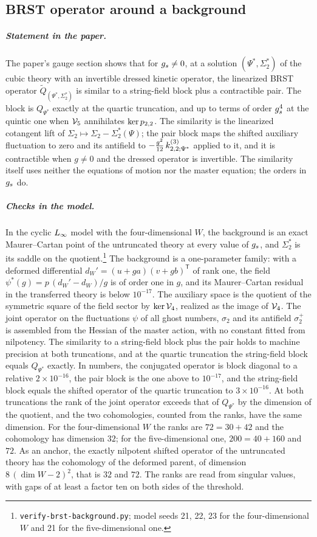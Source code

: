 \subsection{BRST operator around a background}
\label{fdm:sec:brst}

\subparagraph{Statement in the paper.}
The paper's gauge section shows that for $g_s \neq 0$, at a solution $(\Psi^*, \Sigma_2^*)$ of the cubic theory with an invertible dressed kinetic operator, the linearized BRST operator $\widetilde Q_{(\Psi^*, \Sigma_2^*)}$ is similar to a string-field block plus a contractible pair.
The block is $Q_{\Psi^*}$ exactly at the quartic truncation, and up to terms of order $g_s^4$ at the quintic one when $\mathcal{V}_{5}$ annihilates $\ker p_{2,2}$.
The similarity is the linearized cotangent lift of $\Sigma_2 \mapsto \Sigma_2 - \Sigma_2^*(\Psi)$; the pair block maps the shifted auxiliary fluctuation to zero and its antifield to $- \tfrac{g^2}{12} \, \kin{2}{\Psi^*}{3}$ applied to it, and it is contractible when $g \neq 0$ and the dressed operator is invertible.
The similarity itself uses neither the equations of motion nor the master equation; the orders in $g_s$ do.

\subparagraph{Checks in the model.}
In the cyclic $L_\infty$ model with the four-dimensional $W$, the background is an exact Maurer--Cartan point of the untruncated theory at every value of $g_s$, and $\Sigma_2^*$ is its saddle on the quotient.\footnote{\texttt{verify-brst-background.py}; model seeds 21, 22, 23 for the four-dimensional $W$ and 21 for the five-dimensional one.}
The background is a one-parameter family: with a deformed differential $d_W' = (u + g a)(v + g b)^{\mathsf T}$ of rank one, the field $\psi^*(g) = p \, (d_W' - d_W) / g$ is of order one in $g$, and its Maurer--Cartan residual in the transferred theory is below $10^{-17}$.
The auxiliary space is the quotient of the symmetric square of the field sector by $\ker \mathcal{V}_{4}$, realized as the image of $\mathcal{V}_{4}$.
The joint operator on the fluctuations $\psi$ of all ghost numbers, $\sigma_2$ and its antifield $\sigma_2^+$ is assembled from the Hessian of the master action, with no constant fitted from nilpotency.
The similarity to a string-field block plus the pair holds to machine precision at both truncations, and at the quartic truncation the string-field block equals $Q_{\Psi^*}$ exactly.
In numbers, the conjugated operator is block diagonal to a relative $2 \times 10^{-16}$, the pair block is the one above to $10^{-17}$, and the string-field block equals the shifted operator of the quartic truncation to $3 \times 10^{-16}$.
At both truncations the rank of the joint operator exceeds that of $Q_{\Psi^*}$ by the dimension of the quotient, and the two cohomologies, counted from the ranks, have the same dimension.
For the four-dimensional $W$ the ranks are $72 = 30 + 42$ and the cohomology has dimension $32$; for the five-dimensional one, $200 = 40 + 160$ and $72$.
As an anchor, the exactly nilpotent shifted operator of the untruncated theory has the cohomology of the deformed parent, of dimension $8 \, (\dim W - 2)^2$, that is $32$ and $72$.
The ranks are read from singular values, with gaps of at least a factor ten on both sides of the threshold.

